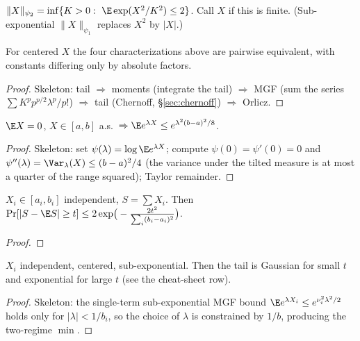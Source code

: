 
\begin{definition}\label{def:subg}
$\|X\|_{\psi_2}=\inf\{K>0:\ \E\exp(X^2/K^2)\le 2\}$. Call $X$  if this is finite.
(Sub-exponential $\|X\|_{\psi_1}$ replaces $X^2$ by $|X|$.)
\end{definition}

\begin{proposition}\label{prop:subg-equiv}
For centered $X$ the four characterizations above are pairwise equivalent, with constants differing only by absolute factors.
\end{proposition}
\begin{proof}
Skeleton: tail $\Rightarrow$ moments (integrate the tail) $\Rightarrow$ MGF (sum the series $\sum K^p p^{p/2}\lambda^p/p!$)
$\Rightarrow$ tail (Chernoff, §\ref{sec:chernoff}) $\Rightarrow$ Orlicz. 
\end{proof}

\begin{lemma}\label{lem:hoeffding}
$\E X=0$, $X\in[a,b]$ a.s.\ $\Rightarrow \E e^{\lambda X}\le e^{\lambda^2(b-a)^2/8}$.
\end{lemma}
\begin{proof}
Skeleton: set $\psi(\lambda)=\log\E e^{\lambda X}$; compute $\psi(0)=\psi'(0)=0$ and
$\psi''(\lambda)=\Var_{\lambda}(X)\le(b-a)^2/4$ (the variance under the tilted measure is at most a quarter of the range squared); Taylor remainder.
\end{proof}

\begin{theorem}\label{thm:hoeffding}
$X_i\in[a_i,b_i]$ independent, $S=\sum X_i$. Then $\Pr[|S-\E S|\ge t]\le 2\exp\!\big(-\tfrac{2t^2}{\sum_i(b_i-a_i)^2}\big)$.
\end{theorem}
\begin{proof}\end{proof}

\begin{theorem}\label{thm:bernstein}
$X_i$ independent, centered, sub-exponential. Then the tail is Gaussian for small $t$ and exponential for large $t$ (see the cheat-sheet row).
\end{theorem}
\begin{proof}
Skeleton: the single-term sub-exponential MGF bound $\E e^{\lambda X_i}\le e^{\nu_i^2\lambda^2/2}$ holds only for
$|\lambda|<1/b_i$, so the choice of $\lambda$ is constrained by $1/b$, producing the two-regime $\min$.
\end{proof}

